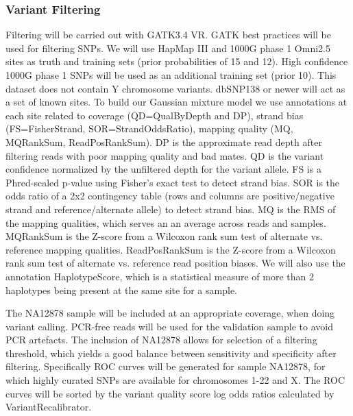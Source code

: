 \subsubsection{Variant Filtering}


Filtering will be carried out with GATK3.4 \gls{VR}. GATK best practices will be used for filtering SNPs.
We will use HapMap III and 1000G phase 1 Omni2.5 sites as truth and training sets (prior probabilities of 15 and 12). High confidence 1000G phase 1 SNPs will be used as an additional training set (prior 10). This dataset does not contain Y chromosome variants. %
dbSNP138 or newer will act as a set of known sites.
To build our Gaussian mixture model we use annotations at each site related to coverage (QD=QualByDepth and DP), strand bias (FS=FisherStrand, SOR=StrandOddsRatio), mapping quality (MQ, MQRankSum, ReadPosRankSum).
DP is the approximate read depth after filtering reads with poor mapping quality and bad mates. QD is the variant confidence normalized by the unfiltered depth for the variant allele. FS is a Phred-scaled p-value using Fisher's exact test to detect strand bias. SOR is the odds ratio of a 2x2 contingency table (rows and columns are positive/negative strand and reference/alternate allele) to detect strand bias. MQ is the RMS of the mapping qualities, which serves an an average across reads and samples. MQRankSum is the Z-score from a Wilcoxon rank sum test of alternate vs. reference mapping qualities. ReadPosRankSum is the Z-score from a Wilcoxon rank sum test of alternate vs. reference read position biases.
We will also use the annotation HaplotypeScore, which is a statistical measure of more than 2 haplotypes being present at the same site for a sample.

The NA12878 sample will be included at an appropriate coverage, when doing variant calling. PCR-free reads will be used for the validation sample to avoid PCR artefacts. The inclusion of NA12878 allows for selection of a filtering threshold, which yields a good balance between sensitivity and specificity after filtering. Specifically ROC curves will be generated for sample NA12878, for which highly curated SNPs
are available for chromosomes 1-22 and X. The ROC curves will be sorted by the variant quality score log odds ratios calculated by VariantRecalibrator.

